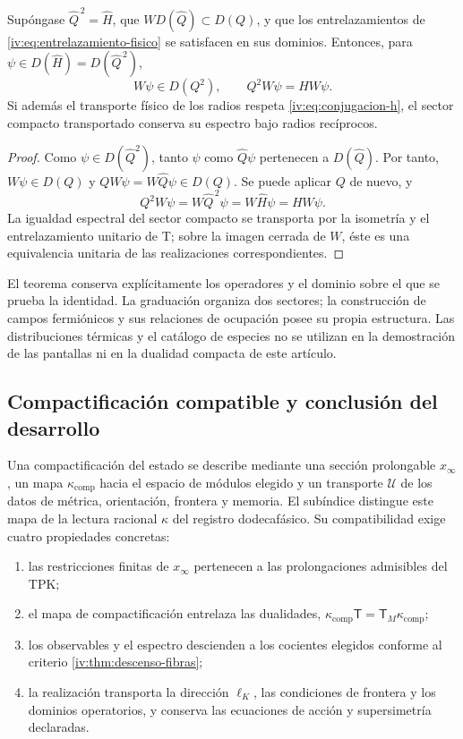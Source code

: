 \begin{theorem}
\label{iv:thm:supercarga-transporte}
Supóngase \(\widehat Q^{\,2}=\widehat H\), que
\(W D(\widehat Q)\subset D(Q)\), y que los
entrelazamientos de \eqref{iv:eq:entrelazamiento-fisico}
se satisfacen en sus dominios. Entonces, para
\(\psi\in D(\widehat H)=D(\widehat Q^{\,2})\),
\[
 W\psi\in D(Q^2),\qquad Q^2W\psi=HW\psi.
\]
Si además el transporte físico de los radios respeta
\eqref{iv:eq:conjugacion-h}, el sector compacto
transportado conserva su espectro bajo radios recíprocos.
\end{theorem}
\begin{proof}
Como \(\psi\in D(\widehat Q^2)\), tanto
\(\psi\) como \(\widehat Q\psi\) pertenecen
a \(D(\widehat Q)\). Por tanto, \(W\psi\in D(Q)\)
y \(QW\psi=W\widehat Q\psi\in D(Q)\). Se puede
aplicar \(Q\) de nuevo, y
\[
 Q^2W\psi=W\widehat Q^{\,2}\psi
          =W\widehat H\psi=HW\psi.
\]
La igualdad espectral del sector compacto se transporta
por la isometría y el entrelazamiento unitario de T;
sobre la imagen cerrada de \(W\), éste es una
equivalencia unitaria de las realizaciones correspondientes.
\end{proof}

El teorema conserva explícitamente los operadores y el
dominio sobre el que se prueba la identidad. La
graduación organiza dos sectores; la construcción de
campos fermiónicos y sus relaciones de ocupación posee
su propia estructura. Las distribuciones térmicas y el
catálogo de especies no se utilizan en la demostración
de las pantallas ni en la dualidad compacta de este
artículo.

\subsection{Compactificación compatible y conclusión del desarrollo}

Una compactificación del estado se describe mediante
una sección prolongable \(x_\infty\), un mapa
\(\kappa_{\mathrm{comp}}\) hacia el espacio de módulos
elegido y un transporte \(\mathcal U\) de los datos
de métrica, orientación, frontera y memoria. El
subíndice distingue este mapa de la lectura racional
\(\kappa\) del registro dodecafásico. Su compatibilidad
exige cuatro propiedades concretas:
\begin{enumerate}
\item las restricciones finitas de \(x_\infty\)
      pertenecen a las prolongaciones admisibles del TPK;
\item el mapa de compactificación entrelaza las dualidades,
      \(\kappa_{\mathrm{comp}}\mathsf T
        =\mathsf T_M\kappa_{\mathrm{comp}}\);
\item los observables y el espectro descienden a los
      cocientes elegidos conforme al criterio
      \ref{iv:thm:descenso-fibras};
\item la realización transporta la dirección
      \(\ell_K\), las condiciones de frontera y los
      dominios operatorios, y conserva las ecuaciones
      de acción y supersimetría declaradas.
\end{enumerate}

